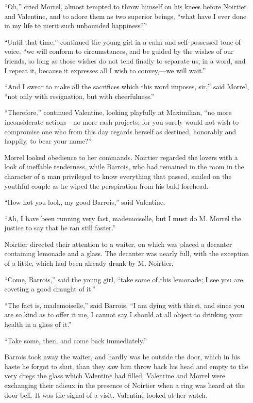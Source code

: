 “Oh,” cried Morrel, almost tempted to throw himself on his knees before
Noirtier and Valentine, and to adore them as two superior beings, “what
have I ever done in my life to merit such unbounded happiness?”

“Until that time,” continued the young girl in a calm and
self-possessed tone of voice, “we will conform to circumstances, and be
guided by the wishes of our friends, so long as those wishes do not
tend finally to separate us; in a word, and I repeat it, because it
expresses all I wish to convey,—we will wait.”

“And I swear to make all the sacrifices which this word imposes, sir,”
said Morrel, “not only with resignation, but with cheerfulness.”

“Therefore,” continued Valentine, looking playfully at Maximilian, “no
more inconsiderate actions—no more rash projects; for you surely would
not wish to compromise one who from this day regards herself as
destined, honorably and happily, to bear your name?”

Morrel looked obedience to her commands. Noirtier regarded the lovers
with a look of ineffable tenderness, while Barrois, who had remained in
the room in the character of a man privileged to know everything that
passed, smiled on the youthful couple as he wiped the perspiration from
his bald forehead.

“How hot you look, my good Barrois,” said Valentine.

“Ah, I have been running very fast, mademoiselle, but I must do M.
Morrel the justice to say that he ran still faster.”

Noirtier directed their attention to a waiter, on which was placed a
decanter containing lemonade and a glass. The decanter was nearly full,
with the exception of a little, which had been already drunk by M.
Noirtier.

“Come, Barrois,” said the young girl, “take some of this lemonade; I
see you are coveting a good draught of it.”

“The fact is, mademoiselle,” said Barrois, “I am dying with thirst, and
since you are so kind as to offer it me, I cannot say I should at all
object to drinking your health in a glass of it.”

“Take some, then, and come back immediately.”

Barrois took away the waiter, and hardly was he outside the door, which
in his haste he forgot to shut, than they saw him throw back his head
and empty to the very dregs the glass which Valentine had filled.
Valentine and Morrel were exchanging their adieux in the presence of
Noirtier when a ring was heard at the door-bell. It was the signal of a
visit. Valentine looked at her watch.

